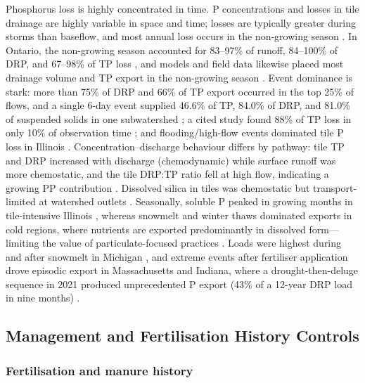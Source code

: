 Phosphorus loss is highly concentrated in time. P concentrations and losses in tile drainage
are highly variable in space and time; losses are typically greater during storms than
baseflow, and most annual loss occurs in the non-growing season
\parencite{King2015}. In Ontario, the non-growing season accounted for 83--97\% of runoff,
84--100\% of DRP, and 67--98\% of TP loss \parencite{VanEsbroeck2016}, and models and field
data likewise placed most drainage volume and TP export in the non-growing season
\parencite{Qi2018,Sadhukhan2019b}. Event dominance is stark: more than 75\% of DRP and 66\% of
TP export occurred in the top 25\% of flows, and a single 6-day event supplied 46.6\% of TP,
84.0\% of DRP, and 81.0\% of suspended solids in one subwatershed \parencite{Brendel2019}; a
cited study found 88\% of TP loss in only 10\% of observation time \parencite{Elsayed2023};
and flooding/high-flow events dominated tile P loss in Illinois \parencite{Li2020b}.
Concentration--discharge behaviour differs by pathway: tile TP and DRP increased with
discharge (chemodynamic) while surface runoff was more chemostatic, and the tile DRP:TP ratio
fell at high flow, indicating a growing PP contribution \parencite{Osterholz2020}. Dissolved
silica in tiles was chemostatic but transport-limited at watershed outlets
\parencite{Sethna2022}. Seasonally, soluble P peaked in growing months in tile-intensive
Illinois \parencite{Algoazany2007}, whereas snowmelt and winter thaws dominated exports in
cold regions, where nutrients are exported predominantly in dissolved form---limiting the
value of particulate-focused practices \parencite{Baulch2019,VanEsbroeck2016}. Loads were
highest during and after snowmelt in Michigan \parencite{Clement2017}, and extreme events
after fertiliser application drove episodic export in Massachusetts and Indiana, where a
drought-then-deluge sequence in 2021 produced unprecedented P export (43\% of a 12-year DRP
load in nine months) \parencite{Millar2025,Mumbi2025b}.

\subsection{Management and Fertilisation History Controls}

\subsubsection{Fertilisation and manure history}

